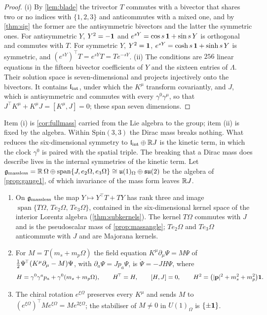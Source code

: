 \begin{proof}
(i) By \cref{lem:blade} the trivector $T$ commutes with a bivector that shares two or no indices with $\{1,2,3\}$ and anticommutes with a
mixed one, and by \cref{thm:sig} the former are the antisymmetric bivectors and the latter the symmetric ones. For antisymmetric $Y$,
$Y^2=-\mathbf 1$ and $e^{sY}=\cos s\,\mathbf 1+\sin s\,Y$ is orthogonal and commutes with $T$. For symmetric $Y$, $Y^2=\mathbf 1$, $e^{sY}=\cosh s\,\mathbf 1+\sinh s\,Y$ is
symmetric, and $(e^{sY})^{\!\top}T=e^{sY}T=Te^{-sY}$. (ii) The conditions are $256$ linear equations in the fifteen bivector coefficients
of $Y$ and the sixteen entries of $\Lambda$. Their solution space is seven-dimensional and projects injectively onto the bivectors. It
contains $\mathfrak l_{\rm int}$, under which the $K^\mu$ transform covariantly, and $J$, which is antisymmetric and commutes with every $\gamma^0\gamma^\mu$,
so that $J^{\!\top}K^\mu+K^\mu J=[K^\mu,J]=0$; these span seven dimensions.
\end{proof}

Item (i) is \cref{cor:fullmass} carried from the Lie algebra to the group; item (ii) is fixed by the algebra. Within $\mathrm{Spin}(3,3)$
the Dirac mass breaks nothing. What reduces the six-dimensional symmetry to $\mathfrak l_{\rm int}\oplus\mathbb{R} J$ is the kinetic term, in which the clock
$\gamma^0$ is paired with the spatial triple. The breaking that a Dirac mass does describe lives in the internal symmetries of the
kinetic term. Let $\mathfrak g_{\rm massless}=\mathbb{R}\,\Omega\oplus\operatorname{span}\{J,e_2\Omega,e_3\Omega\}\cong\mathfrak{u}(1)_\Omega\oplus\mathfrak{su}(2)$ be the
algebra of \cref{prop:gauge1}, of which invariance of the mass form leaves $\mathbb{R} J$.

\begin{proposition}
\label{mb:massless}
\begin{enumerate}[label=(\roman*),leftmargin=2.2em]
\item On $\mathfrak g_{\rm massless}$ the map $Y\mapsto Y^{\!\top}T+TY$ has rank three and image $\operatorname{span}\{T\Omega,\,Te_2\Omega,\,Te_3\Omega\}$,
contained in the six-dimensional kernel space of the interior Lorentz algebra (\cref{thm:subkernels}). The kernel $T\Omega$ commutes
with $J$ and is the pseudoscalar mass of \cref{prop:massangle}; $Te_2\Omega$ and $Te_3\Omega$ anticommute with $J$ and are Majorana kernels.
\item For $M=T(m_s+m_p\Omega)$ the field equation $K^\mu\partial_\mu\Psi=M\Psi$ of $\tfrac12\Psi^{\!\top}(K^\mu\partial_\mu-M)\Psi$, with
$\partial_a\Psi=Jp_a\Psi$, is $\dot\Psi=-JH\Psi$, where
\begin{equation}
\label{mb:eq:Hmp}
H=\gamma^0\gamma^ap_a+\gamma^0(m_s+m_p\Omega),\qquad H^{\!\top}=H,\qquad [H,J]=0,\qquad H^2=\bigl(|\mathbf p|^2+m_s^2+m_p^2\bigr)\mathbf 1 .
\end{equation}
\item The chiral rotation $e^{\xi\Omega}$ preserves every $K^\mu$ and sends $M$ to $(e^{\xi\Omega})^{\!\top}Me^{\xi\Omega}=Me^{2\xi\Omega}$; the stabiliser
of $M\neq0$ in $U(1)_\Omega$ is $\{\pm\mathbf 1\}$.
\end{enumerate}
\end{proposition}

